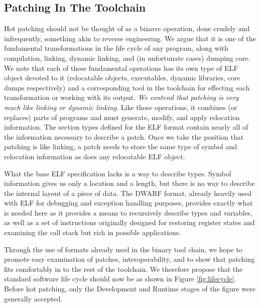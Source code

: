 \subsection{Patching In The Toolchain}
\label{ssec:patchingvlinking}
Hot patching should not be thought of as a bizarre operation, done
crudely and infrequently, something akin to reverse engineering. We
argue that it is one of the fundamental transformations in the life
cycle of any program, along with compilation, linking, dynamic
linking, and (in unfortunate cases) dumping core. We note that each of
these fundamental operations has its own type of ELF object devoted to
it (relocatable objects, executables, dynamic libraries, core dumps
respectively) and a corresponding tool in the toolchain for effecting
each transformation or working with its output. \emph{We contend that
  patching is very much like linking or dynamic linking}. Like those
operations, it combines (or replaces) parts of programs and must
generate, modify, and apply relocation information. The section types
defined for the ELF format contain nearly all of the information
necessary to describe a patch. Once we take the position that patching
is like linking, a patch needs to store the same type of symbol and
relocation information as does any relocatable ELF object.

What the base ELF specification lacks is a way to describe
types. Symbol information gives us only a location and a length, but
there is no way to describe the internal layout of a piece of
data. The DWARF format, already heavily used with ELF for debugging
and exception handling purposes, provides exactly what is needed here
as it provides a means to recursively describe types and variables, as
well as a set of instructions originally designed for restoring
register states and examining the call stack but rich in possible
applications. 

Through the use of formats already used in the binary tool chain, we
hope to promote easy examination of patches, interoperability, and to
show that patching fits comfortably in to the rest of the
toolchain. We therefore propose that the standard software life cycle
should now be as shown in Figure \ref{fig:lifecycle}. Before hot
patching, only the Development and Runtime stages of the figure were
generally accepted.


